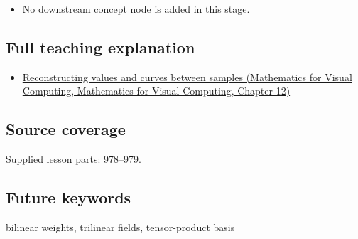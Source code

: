 \begin{itemize}
\tightlist
\item
  No downstream concept node is added in this stage.
\end{itemize}

\subsection{Full teaching explanation}\label{appendix-0a09b6dfdc86-full-teaching-explanation}

\begin{itemize}
\tightlist
\item
  \href{../02-Mathematics-for-Visual-Computing/main.pdf\#nameddest=02-foundations-ii-ch028-reconstructing-values-and-curves-between-samples}{Reconstructing values and curves between samples (Mathematics for Visual Computing, Mathematics for Visual Computing, Chapter 12)}
\end{itemize}

\subsection{Source coverage}\label{appendix-0a09b6dfdc86-source-coverage}

Supplied lesson parts: 978--979.

\subsection{Future keywords}\label{appendix-0a09b6dfdc86-future-keywords}

bilinear weights, trilinear fields, tensor-product basis

